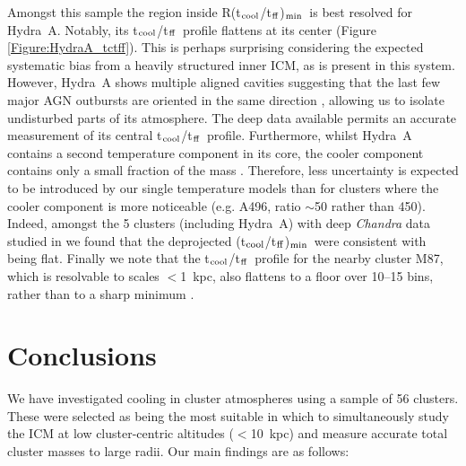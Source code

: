 \documentclass[twocolumn]{aastex6}
\newcommand{\tctff}{{t$_{\rm cool}$/t$_{\rm ff}$}}
\newcommand{\tctffmin}{(\tctff)$_{\rm min}$}
\newcommand{\Rtctffmin}{R(\tctff)$_{\rm min}$}
\begin{document}
Amongst this sample the region inside \Rtctffmin\ is best resolved for Hydra~A.  Notably, its \tctff\ profile flattens at its center (Figure \ref{Figure:HydraA_tctff}). This is perhaps surprising considering the expected systematic bias from a heavily structured inner ICM, as is present in this system.  However, Hydra~A shows multiple aligned cavities suggesting that the last few major AGN outbursts are oriented in the same direction \cite[][]{Wise07}, allowing us to isolate undisturbed parts of its atmosphere.  The deep data available permits an accurate measurement of its central \tctff\ profile.  Furthermore, whilst Hydra~A contains a second temperature component in its core, the cooler component contains only a small fraction of the mass \cite[$\sim$1/450 of the hot component,][]{Hogan17}.  Therefore, less uncertainty is expected to be introduced by our single temperature models than for clusters where the cooler component is more noticeable (e.g. A496, ratio $\sim$50 rather than 450). Indeed, amongst the 5 clusters (including Hydra~A) with deep {\it Chandra} data studied in \citet[][]{Hogan17} we found that the deprojected \tctffmin\ were consistent with being flat.  Finally we note that the \tctff\ profile for the nearby cluster M87, which is resolvable to scales $<$1~kpc, also flattens to a floor over 10--15 bins, rather than to a sharp minimum \cite[][]{McNamara16}.

\section{Conclusions} \label{Section:Conclusions}

We have investigated cooling in cluster atmospheres using a sample of 56 clusters.  These were selected as being the most suitable in which to simultaneously study the ICM at low cluster-centric altitudes ($<$10~kpc) and measure accurate total cluster masses to large radii.  Our main findings are as follows:
\end{document}
